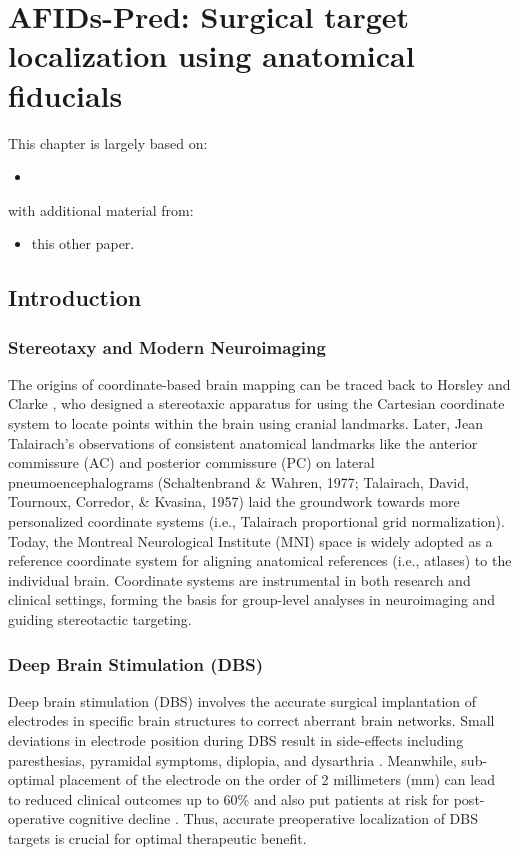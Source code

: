 \chapter{AFIDs-Pred: Surgical target localization using anatomical fiducials}\label{chap:afidspred}
\newpage
\sloppy
This chapter is largely based on:
\begin{itemize}[noitemsep,topsep=0pt]
	\item \cite{taha2023}
\end{itemize}
with additional material from:
\begin{itemize}[noitemsep,topsep=0pt]
	\item this other paper.
\end{itemize}

\section{Introduction}

\subsection{Stereotaxy and Modern Neuroimaging}
The origins of coordinate-based brain mapping can be traced back to Horsley and Clarke \cite{ref}, who designed a stereotaxic apparatus for using the Cartesian coordinate system to locate points within the brain using cranial landmarks. Later, Jean Talairach’s observations of consistent anatomical landmarks like the anterior commissure (AC) and posterior commissure (PC) on lateral pneumoencephalograms (Schaltenbrand \& Wahren, 1977; Talairach, David, Tournoux, Corredor, \& Kvasina, 1957) laid the groundwork towards more personalized coordinate systems (i.e., Talairach proportional grid normalization). Today, the Montreal Neurological Institute (MNI) space \cite{ref} is widely adopted as a reference coordinate system for aligning anatomical references (i.e., atlases) to the individual brain. Coordinate systems are instrumental in both research and clinical settings, forming the basis for group-level analyses in neuroimaging and guiding stereotactic targeting.
\subsection{Deep Brain Stimulation (DBS)}
Deep brain stimulation (DBS) involves the accurate surgical implantation of electrodes in specific brain structures to correct aberrant brain networks. Small deviations in electrode position during DBS result in side-effects including paresthesias, pyramidal symptoms, diplopia, and dysarthria \cite{ref}. Meanwhile, sub-optimal placement of the electrode on the order of 2 millimeters (mm) can lead to reduced clinical outcomes up to 60\% \cite{ref} and also put patients at risk for post-operative cognitive decline \cite{ref}. Thus, accurate preoperative localization of DBS targets is crucial for optimal therapeutic benefit.
